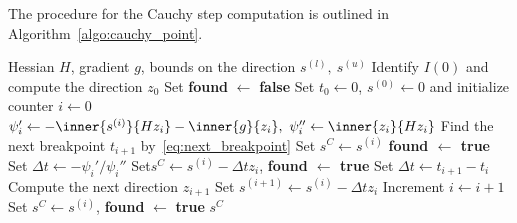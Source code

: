 The procedure for the Cauchy step computation is outlined in Algorithm~\ref{algo:cauchy_point}.
\begin{algorithm}
	\caption{Cauchy step computation}\label{algo:cauchy_point}
	\begin{algorithmic}[1]
		\Require Hessian $H$, gradient $g$, bounds on the direction $s^{(l)},\ s^{(u)}$
		\State Identify $I(0)$ and compute the direction $z_0$
		\State Set \textbf{found} $\gets$ \textbf{false} 
		\State Set $t_0\gets 0$, $s^{(0)}\gets 0$ and initialize counter $i\gets 0$
		\Repeat
		\State $\psi_i' \gets -\inner{s^{(i)}}{Hz_i}-\inner{g}{z_i},\ \psi_i'' \gets \inner{z_i}{Hz_i}$
		\State Find the next breakpoint $t_{i+1}$ by~\eqref{eq:next_breakpoint}
		\State Set $s^C \gets s^{(i)}$
		\State \textbf{found $\gets$ \textbf{true}}
		\State Set $\Delta t \gets - \psi_i'/\psi_i''$
		\State Set$s^C \gets s^{(i)} - \Delta t z_i$, \textbf{found $\gets$ \textbf{true}}
		\Else
		\State Set $\Delta t \gets t_{i+1}-t_i$
		\State Compute the next direction $z_{i+1}$
		\State Set $s^{(i+1)} \gets s^{(i)} - \Delta t z_i$
		\EndIf
		\State Increment $i \gets i+1$
		\State Set $s^C \gets s^{(i)}$, \textbf{found} $\gets$ \textbf{true}
		\EndIf
		\State \Return $s^C$
	\end{algorithmic}
\end{algorithm}
